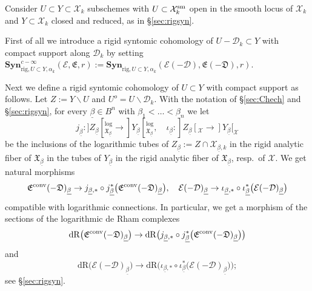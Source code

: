 \documentclass[asterisque,english]{smfart}
\begin{document}
Consider $U\subset Y \subset \mathcal{X}_k$ subschemes with $U\subset \mathcal{X}_k^{\rm sm}$ open in the smooth locus of $\mathcal{X}_k$ and $Y\subset \mathcal{X}_k$ closed and reduced, as in \S \ref{sec:rigsyn}.  

First of all we introduce a rigid syntomic cohomology  of $U-\mathcal{D}
_{k}\subset Y$ with compact support along $\mathcal{D}_{k}$
by setting $\mathbf{Syn}_{\mathrm{rig},U\subset Y,\alpha
_{k}}^{c-\infty }\left( \mathcal{E},\mathfrak{E},r\right) :=\mathbf{
Syn}_{\mathrm{rig},U\subset Y,\alpha _{k}}\left( \mathcal{E}\left( -\mathcal{D
}\right) ,\mathfrak{E}\left( -\mathfrak{D}\right) ,r\right) $. 


Next we define a rigid syntomic cohomology of $U\subset Y$
with compact support as follows. Let $Z:=Y \backslash U$ and $U^o=U\backslash \mathcal{D}_k$. With the notation of \S \ref{sec:Chech} and \S \ref{sec:rigsyn}, for every $\underline{\beta}\in B^n$ with $\beta_1<\ldots < \beta_n$  we let $$j_{\underline{\beta}} \colon ]Z_{\underline{\beta}} [_{\mathfrak{X}_{\underline{\beta}}}^{\log}\longrightarrow ]Y_{\underline{\beta}} [_{\mathfrak{X}_{\underline{\beta}}}^{\log}, \quad \iota_{\underline{\beta}}\colon ]Z_{\underline{\beta}} [_{\mathcal{X}}\longrightarrow ]Y_{\underline{\beta}} [_{\mathcal{X}} $$be the inclusions of the logarithmic tubes of $Z_{\underline{\beta}}:=Z \cap \mathcal{X}_{\underline{\beta},k}$  in the rigid analytic fiber of $\mathfrak{X}_{\underline{\beta}}$ in the tubes of $Y_{\underline{\beta}}$ in  the rigid analytic fiber  of $\mathfrak{X}_{\underline{\beta}}$, resp.~of $\mathcal{X}$. We get  natural morphisms  $$\mathfrak{E}^{\rm conv}(-\mathfrak{D})_{\underline{\beta}} \to j_{\underline{\beta},\ast} \circ j_{\underline{\beta}}^\ast\bigl(\mathfrak{E}^{\rm conv}(-\mathfrak{D})_{\underline{\beta}}\bigr), \quad \mathcal{E}(-\mathcal{D})_{\underline{\beta}} \to \iota_{\underline{\beta},\ast} \circ \iota_{\underline{\beta}}^\ast\bigl(\mathcal{E}(-\mathcal{D})_{\underline{\beta}}\bigr)$$compatible with logarithmic connections.  In particular, we get a morphism of the sections of the logarithmic de Rham complexes $$ \mathrm{dR}\bigl(\mathfrak{E}^{\rm conv}(-\mathfrak{D})_{\underline{\beta}}\bigr)\to \mathrm{dR}\bigl( j_{\underline{\beta},\ast} \circ j_{\underline{\beta}}^\ast\bigl(\mathfrak{E}^{\rm conv}(-\mathfrak{D})_{\underline{\beta}}\bigr)\bigr)$$and $$ \mathrm{dR}\bigl(\mathcal{E}(-\mathcal{D})_{\underline{\beta}}\bigr)\to \mathrm{dR}\bigl( \iota_{\underline{\beta},\ast} \circ \iota_{\underline{\beta}}^\ast\bigl(\mathcal{E}(-\mathcal{D})_{\underline{\beta}}\bigr)\bigr);$$see \S \ref{sec:rigsyn}. 
\end{document}
